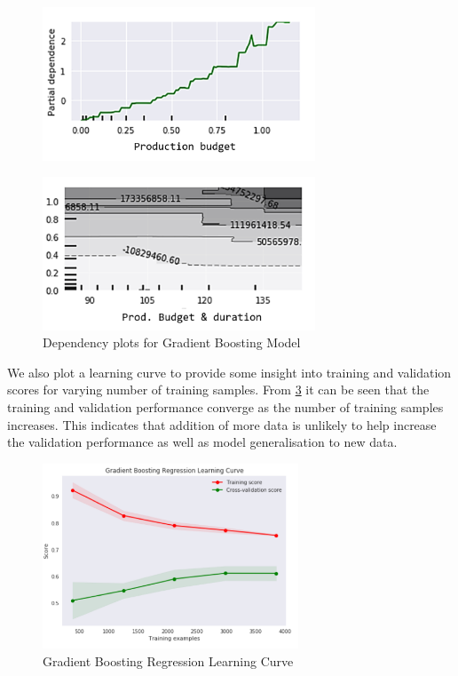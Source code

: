 \fi
\begin{figure}[h]
\centering
\includegraphics[width=3.2in]{figures/gb_dependency_3}
\label{fig:gradient_boost_dependency}
\end{figure}
\begin{figure}[h]
\centering
\includegraphics[width=3.2in]{figures/gb_dependency_4}
\caption{Dependency plots for Gradient Boosting Model} 
\label{fig:gradient_boost_dependency}
\end{figure}

We also plot a learning curve to provide some insight into training and validation scores for varying number of training samples. From \figurename{} \ref{fig:gradient_boost} it can be seen that the training and validation performance converge as the number of training samples increases. This indicates that addition of  more data is unlikely to help increase the validation performance as well as model generalisation to new data.

\begin{figure}[h]
\centering
\includegraphics[width=3.0in]{figures/gradient_boost}
\caption{Gradient Boosting Regression Learning Curve} 
\label{fig:gradient_boost}
\end{figure}

